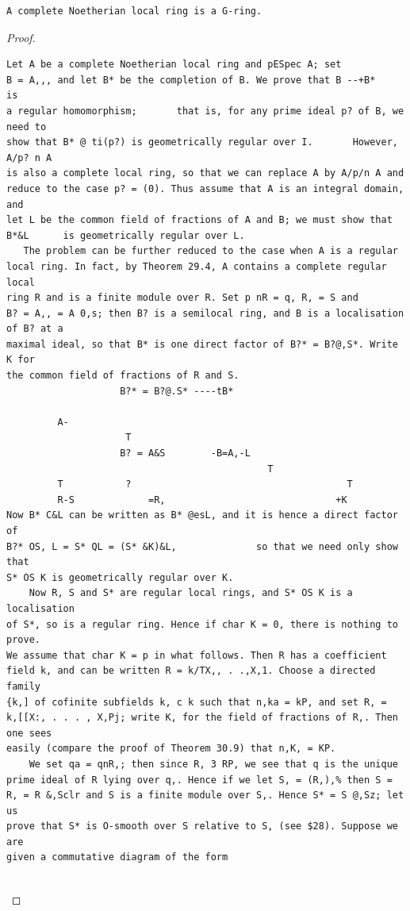 \begin{theorem}\label{mcrt-auto-theorem-32-3}\uses{}
\begin{verbatim}
A complete Noetherian local ring is a G-ring.
\end{verbatim}
\end{theorem}
\begin{proof}
\begin{verbatim}
Let A be a complete Noetherian local ring and pESpec A; set
B = A,,, and let B* be the completion of B. We prove that B --+B*               is
a regular homomorphism;       that is, for any prime ideal p? of B, we need to
show that B* @ ti(p?) is geometrically regular over I.       However, A/p? n A
is also a complete local ring, so that we can replace A by A/p/n A and
reduce to the case p? = (0). Thus assume that A is an integral domain, and
let L be the common field of fractions of A and B; we must show that
B*&L      is geometrically regular over L.
   The problem can be further reduced to the case when A is a regular
local ring. In fact, by Theorem 29.4, A contains a complete regular local
ring R and is a finite module over R. Set p nR = q, R, = S and
B? = A,, = A 0,s; then B? is a semilocal ring, and B is a localisation of B? at a
maximal ideal, so that B* is one direct factor of B?* = B?@,S*. Write K for
the common field of fractions of R and S.
                    B?* = B?@.S* ----tB*

         A-
                     T
                    B? = A&S        -B=A,-L
                                              T
         T           ?                                      T
         R-S             =R,                              +K
Now B* C&L can be written as B* @esL, and it is hence a direct factor of
B?* OS, L = S* QL = (S* &K)&L,              so that we need only show that
S* OS K is geometrically regular over K.
    Now R, S and S* are regular local rings, and S* OS K is a localisation
of S*, so is a regular ring. Hence if char K = 0, there is nothing to prove.
We assume that char K = p in what follows. Then R has a coefficient
field k, and can be written R = k/TX,, . .,X,1. Choose a directed family
{k,] of cofinite subfields k, c k such that n,ka = kP, and set R, =
k,[[X:, . . . , X,Pj; write K, for the field of fractions of R,. Then one sees
easily (compare the proof of Theorem 30.9) that n,K, = KP.
    We set qa = qnR,; then since R, 3 RP, we see that q is the unique
prime ideal of R lying over q,. Hence if we let S, = (R,),% then S =
R, = R &,Sclr and S is a finite module over S,. Hence S* = S @,Sz; let us
prove that S* is O-smooth over S relative to S, (see $28). Suppose we are
given a commutative diagram of the form


\end{verbatim}
\end{proof}
